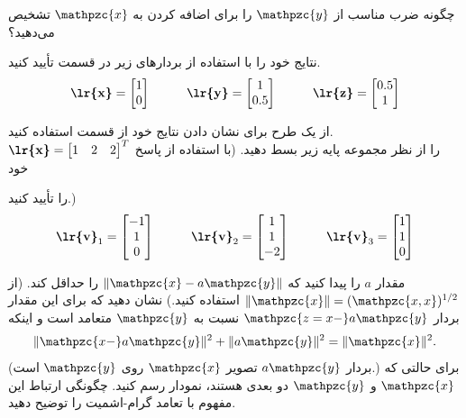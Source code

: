 \documentclass[a4paper,12pt]{report}
\begin{document}
\textbf{}
چگونه ضرب مناسب از $ \mathpzc{y} $ را برای اضافه کردن به $ \mathpzc{x} $ تشخیص می‌دهید؟

\textbf{}
نتایج خود را با استفاده از بردارهای زیر در قسمت  تأیید کنید.
$$
\textbf{\lr{x}}=
\begin{bmatrix}
	1 \\ 0
\end{bmatrix}
\hspace{1cm}
\textbf{\lr{y}}=
\begin{bmatrix}
	1 \\ 0.5
\end{bmatrix}
\hspace{1cm}
\textbf{\lr{z}}=
\begin{bmatrix}
	0.5 \\ 1
\end{bmatrix}
$$

\textbf{}
از یک طرح برای نشان دادن نتایج خود از قسمت  استفاده کنید.\\

\hspace{-2.5cm}\textbf{}\hspace{0.6cm}  
$
\textbf{\lr{x}}=
\begin{bmatrix}
	1 & 2 & 2
\end{bmatrix}^T
$
  را از نظر مجموعه پایه زیر بسط دهید. (با استفاده از  پاسخ خود
  
   را تأیید کنید.)
   $$
   \textbf{\lr{v}}_1=
   \begin{bmatrix}
   	-1 \\ 1 \\ 0
   \end{bmatrix}
   \hspace{1cm}
   \textbf{\lr{v}}_2=
   \begin{bmatrix}
   	1 \\ 1 \\ -2
   \end{bmatrix}
   \hspace{1cm}
   \textbf{\lr{v}}_3=
   \begin{bmatrix}
   	1 \\ 1 \\ 0
   \end{bmatrix}
   $$

\hspace{-2.5cm}\textbf{}\hspace{0.6cm}  
مقدار $ a $ را پیدا کنید که 
$ \Vert \mathpzc{x}-a\mathpzc{y} \Vert$
 را حداقل کند. (از 
 $ \Vert \mathpzc{x} \Vert = (\mathpzc{x,x})^{1/2}$
  استفاده کنید.) نشان دهید که برای این مقدار بردار 
  $ \mathpzc{z=x-}a\mathpzc{y} $
   نسبت به $ \mathpzc{y} $ متعامد است و اینکه
   $$
   \Vert \mathpzc{x-}a\mathpzc{y} \Vert^2+
   \Vert a\mathpzc{y} \Vert^2=
   \Vert \mathpzc{x} \Vert^2.
   $$
(بردار 
$ a\mathpzc{y} $
 تصویر $ \mathpzc{x} $ روی $ \mathpzc{y} $ است.) برای حالتی که $ \mathpzc{x} $ و $ \mathpzc{y} $ دو بعدی هستند، نمودار رسم کنید. چگونگی ارتباط این مفهوم با تعامد گرام-اشمیت را توضیح دهید.
\end{document}
